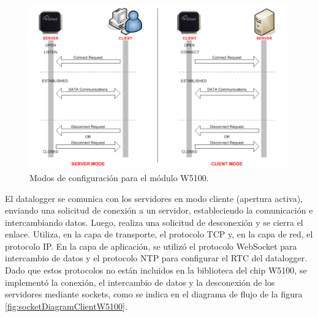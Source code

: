 \begin{figure}[H]
    \centering
    \includegraphics[width=0.9\linewidth]{Figuras/datalogger/Firmware/socketModoDeTrabajoW5100.png}
    \caption{Modos de configuración para el módulo W5100.}
    \label{fig:socketModoDeTrabajoW5100}
\end{figure}

El datalogger se comunica con los servidores en modo cliente (apertura activa), enviando una solicitud de conexión a un servidor, estableciendo la comunicación e intercambiando datos. Luego, realiza una solicitud de desconexión y se cierra el enlace. Utiliza, en la capa de transporte, el protocolo TCP y, en la capa de red, el protocolo IP. En la capa de aplicación, se utilizó el protocolo WebSocket para intercambio de datos y el protocolo NTP para configurar el RTC del datalogger. Dado que estos protocolos no están incluidos en la biblioteca del chip W5100, se implementó la conexión, el intercambio de datos y la desconexión de los servidores mediante sockets, como se indica en el diagrama de flujo de la figura \ref{fig:socketDiagramClientW5100}.


